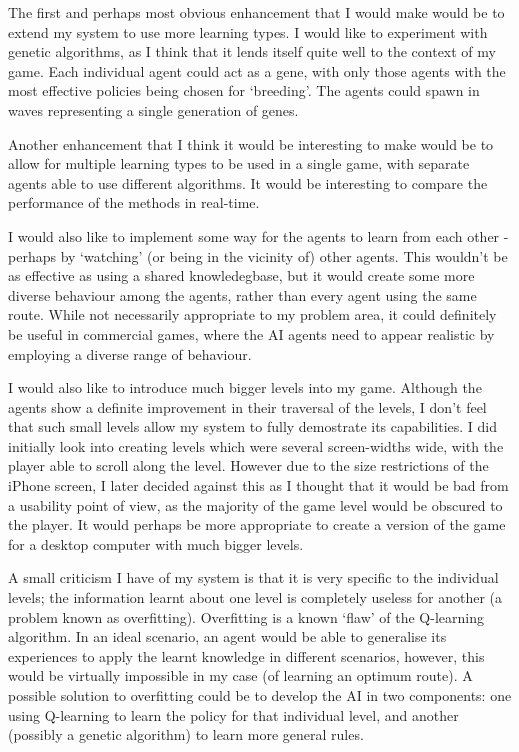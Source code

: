 \documentclass[a4paper,oneside]{report}
\begin{document}
The first and perhaps most obvious enhancement that I would make would be to extend my system to use more learning types. I would like to experiment with genetic algorithms, as I think that it lends itself quite well to the context of my game. Each individual agent could act as a gene, with only those agents with the most effective policies being chosen for `breeding'. The agents could spawn in waves representing a single generation of genes.

Another enhancement that I think it would be interesting to make would be to allow for multiple learning types to be used in a single game, with separate agents able to use different algorithms. It would be interesting to compare the performance of the methods in real-time. 

I would also like to implement some way for the agents to learn from each other - perhaps by `watching' (or being in the vicinity of) other agents. This wouldn't be as effective as using a shared knowledegbase, but it would create some more diverse behaviour among the agents, rather than every agent using the same route. While not necessarily appropriate to my problem area, it could definitely be useful in commercial games, where the AI agents need to appear realistic by employing a diverse range of behaviour.

I would also like to introduce much bigger levels into my game. Although the agents show a definite improvement in their traversal of the levels, I don't feel that such small levels allow my system to fully demostrate its capabilities. I did initially look into creating levels which were several screen-widths wide, with the player able to scroll along the level. However due to the size restrictions of the iPhone screen, I later decided against this as I thought that it would be bad from a usability point of view, as the majority of the game level would be obscured to the player. It would perhaps be more appropriate to create a version of the game for a desktop computer with much bigger levels.

A small criticism I have of my system is that it is very specific to the individual levels; the information learnt about one level is completely useless for another (a problem known as overfitting). Overfitting is a known `flaw' of the Q-learning algorithm. In an ideal scenario, an agent would be able to generalise its experiences to apply the learnt knowledge in different scenarios, however, this would be virtually impossible in my case (of learning an optimum route). A possible solution to overfitting could be to develop the AI in two components: one using Q-learning to learn the policy for that individual level, and another (possibly a genetic algorithm) to learn more general rules. 
\end{document}
